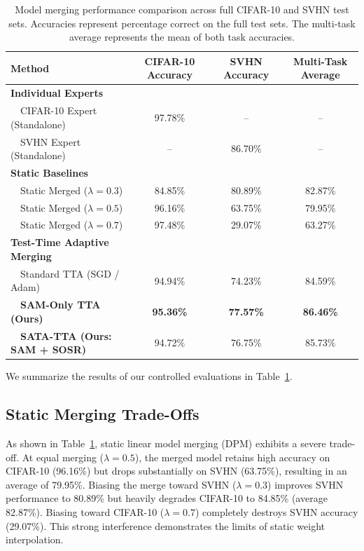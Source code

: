 \documentclass{article}
\theoremstyle{plain}
\theoremstyle{definition}
\theoremstyle{remark}
\begin{document}
\begin{table}[t]
  \caption{Model merging performance comparison across full CIFAR-10 and SVHN test sets. Accuracies represent percentage correct on the full test sets. The multi-task average represents the mean of both task accuracies.}
  \label{table-results}
  \vskip 0.15in
  \begin{center}
    \begin{small}
      \begin{tabular}{lccc}
        \toprule
        Method & CIFAR-10 Accuracy & SVHN Accuracy & Multi-Task Average \\
        \midrule
        \textbf{Individual Experts} & & & \\
        ~~CIFAR-10 Expert (Standalone) & 97.78\% & -- & -- \\
        ~~SVHN Expert (Standalone) & -- & 86.70\% & -- \\
        \midrule
        \textbf{Static Baselines} & & & \\
        ~~Static Merged ($\lambda = 0.3$) & 84.85\% & 80.89\% & 82.87\% \\
        ~~Static Merged ($\lambda = 0.5$) & 96.16\% & 63.75\% & 79.95\% \\
        ~~Static Merged ($\lambda = 0.7$) & 97.48\% & 29.07\% & 63.27\% \\
        \midrule
        \textbf{Test-Time Adaptive Merging} & & & \\
        ~~Standard TTA (SGD / Adam) & 94.94\% & 74.23\% & 84.59\% \\
        ~~\textbf{SAM-Only TTA (Ours)} & \textbf{95.36\%} & \textbf{77.57\%} & \textbf{86.46\%} \\
        ~~\textbf{SATA-TTA (Ours: SAM + SOSR)} & 94.72\% & 76.75\% & 85.73\% \\
        \bottomrule
      \end{tabular}
    \end{small}
  \end{center}
  \vskip -0.1in
\end{table}

We summarize the results of our controlled evaluations in Table~\ref{table-results}.

\subsection{Static Merging Trade-Offs}

As shown in Table~\ref{table-results}, static linear model merging (DPM) exhibits a severe trade-off. At equal merging ($\lambda=0.5$), the merged model retains high accuracy on CIFAR-10 (96.16\%) but drops substantially on SVHN (63.75\%), resulting in an average of 79.95\%. Biasing the merge toward SVHN ($\lambda=0.3$) improves SVHN performance to 80.89\% but heavily degrades CIFAR-10 to 84.85\% (average 82.87\%). Biasing toward CIFAR-10 ($\lambda=0.7$) completely destroys SVHN accuracy (29.07\%). This strong interference demonstrates the limits of static weight interpolation.
\end{document}
